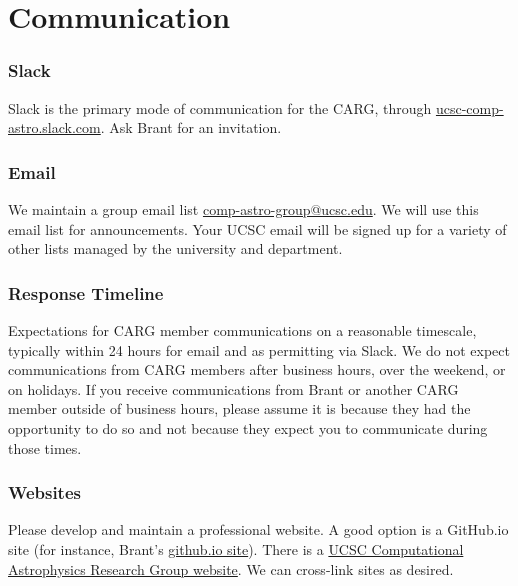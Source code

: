 \section{Communication}
\label{sec:communication}


\subsubsection{Slack}
Slack is the primary mode
of communication for the CARG,
through \href{http://ucsc-comp-astro.slack.com}{ucsc-comp-astro.slack.com}.
Ask Brant for an invitation.

\subsubsection{Email}
We maintain a group email
list \href{mailto:comp-astro-group@ucsc.edu}{comp-astro-group@ucsc.edu}.
We will use this email list for
announcements. Your UCSC email
will be signed up for a variety
of other lists managed by the
university and department.

\subsubsection{Response Timeline}
Expectations for CARG member
communications on a reasonable timescale, typically within
24 hours for email and as
permitting via Slack.
We do not expect communications
from CARG members after business
hours, over the weekend, or
on holidays. If you receive
communications from Brant or
another CARG member outside of
business hours, please assume
it is because
they had the opportunity
to do so and not because they
expect you to communicate during
those times.

\subsubsection{Websites}
Please develop and maintain a
professional website. A good
option is a GitHub.io site (for
instance, Brant's \href{http://brantr.github.io}{github.io site}).
There is a 
\href{http://robertson.sites.ucsc.edu}{UCSC Computational Astrophysics Research Group website}. We can
cross-link sites as desired.

